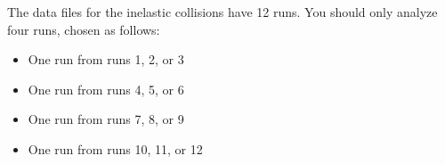 The data files for the inelastic collisions have 12 runs. You should only analyze four runs, chosen as follows:
\begin{itemize}
    \item One run from runs 1, 2, or 3
    \item One run from runs 4, 5, or 6
    \item One run from runs 7, 8, or 9
    \item One run from runs 10, 11, or 12
\end{itemize}
%
%
